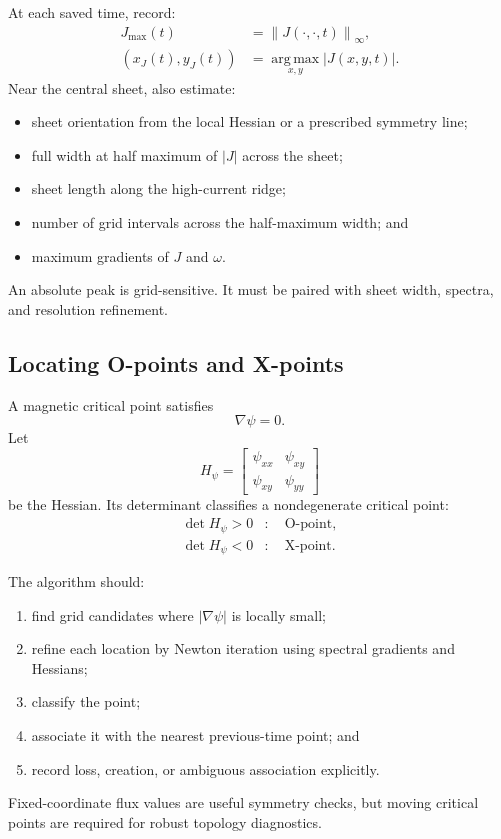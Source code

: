 \documentclass[11pt]{article}
\newcommand{\norm}[1]{\left\lVert #1\right\rVert}
\begin{document}
At each saved time, record:
\begin{align}
J_{\max}(t)&=\norm{J(\cdot,\cdot,t)}_\infty,\\
(x_J(t),y_J(t))&=\operatorname*{arg\,max}_{x,y}|J(x,y,t)|.
\end{align}
Near the central sheet, also estimate:
\begin{itemize}
  \item sheet orientation from the local Hessian or a prescribed symmetry line;
  \item full width at half maximum of $|J|$ across the sheet;
  \item sheet length along the high-current ridge;
  \item number of grid intervals across the half-maximum width; and
  \item maximum gradients of $J$ and $\omega$.
\end{itemize}

An absolute peak is grid-sensitive. It must be paired with sheet width, spectra, and resolution refinement.

\subsection{Locating O-points and X-points}

A magnetic critical point satisfies
\begin{equation}
\nabla\psi=0.
\end{equation}
Let
\begin{equation}
H_\psi=
\begin{bmatrix}
\psi_{xx}&\psi_{xy}\\
\psi_{xy}&\psi_{yy}
\end{bmatrix}
\end{equation}
be the Hessian. Its determinant classifies a nondegenerate critical point:
\begin{align}
\det H_\psi>0&:\quad \text{O-point},\\
\det H_\psi<0&:\quad \text{X-point}.
\end{align}

The algorithm should:
\begin{enumerate}[label=\arabic*.]
  \item find grid candidates where $|\nabla\psi|$ is locally small;
  \item refine each location by Newton iteration using spectral gradients and Hessians;
  \item classify the point;
  \item associate it with the nearest previous-time point; and
  \item record loss, creation, or ambiguous association explicitly.
\end{enumerate}
Fixed-coordinate flux values are useful symmetry checks, but moving critical points are required for robust topology diagnostics.
\end{document}
